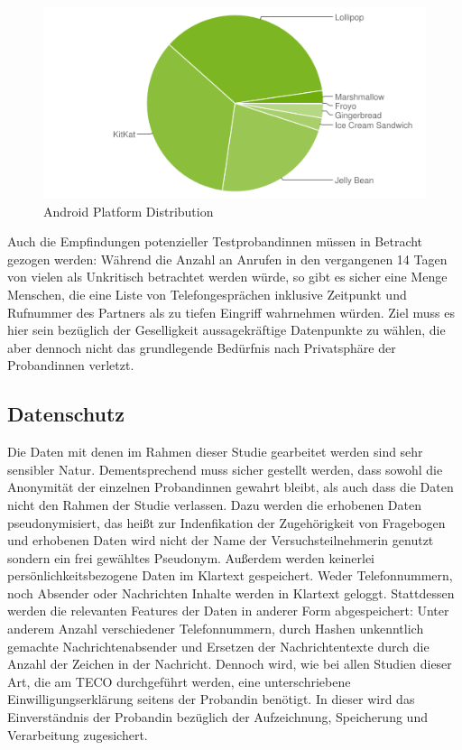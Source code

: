 \begin{figure}[h]
    \centering
    \includegraphics{images/chart.png}
    \caption{Android Platform Distribution\cite{androiddistr}}
    \label{fig:androidplatformdistr}
\end{figure}

Auch die Empfindungen potenzieller Testprobandinnen müssen in Betracht gezogen werden:
Während die Anzahl an Anrufen in den vergangenen 14 Tagen von vielen als Unkritisch betrachtet werden würde, so gibt es sicher eine Menge Menschen, 
die eine Liste von Telefongesprächen inklusive Zeitpunkt und Rufnummer des Partners als zu tiefen Eingriff wahrnehmen würden.
Ziel muss es hier sein bezüglich der Geselligkeit aussagekräftige Datenpunkte zu wählen, 
die aber dennoch nicht das grundlegende Bedürfnis nach Privatsphäre der Probandinnen verletzt.


\subsection{Datenschutz}

Die Daten mit denen im Rahmen dieser Studie gearbeitet werden sind sehr sensibler Natur.
Dementsprechend muss sicher gestellt werden, dass sowohl die Anonymität der einzelnen Probandinnen gewahrt bleibt,
als auch dass die Daten nicht den Rahmen der Studie verlassen.
Dazu werden die erhobenen Daten pseudonymisiert, das heißt zur Indenfikation der Zugehörigkeit von Fragebogen und erhobenen Daten wird nicht der Name der Versuchsteilnehmerin genutzt sondern ein frei gewähltes Pseudonym.
Außerdem werden keinerlei persönlichkeitsbezogene Daten im Klartext gespeichert.
Weder Telefonnummern, noch Absender oder Nachrichten Inhalte werden in Klartext geloggt.
Stattdessen werden die relevanten Features der Daten in anderer Form abgespeichert:
Unter anderem Anzahl verschiedener Telefonnummern, durch Hashen unkenntlich gemachte Nachrichtenabsender und Ersetzen der Nachrichtentexte durch die Anzahl der Zeichen in der Nachricht.
Dennoch wird, wie bei allen Studien dieser Art, die am TECO durchgeführt werden,
eine unterschriebene Einwilligungserklärung seitens der Probandin benötigt.
In dieser wird das Einverständnis der Probandin bezüglich der Aufzeichnung, Speicherung und Verarbeitung zugesichert.
\par




